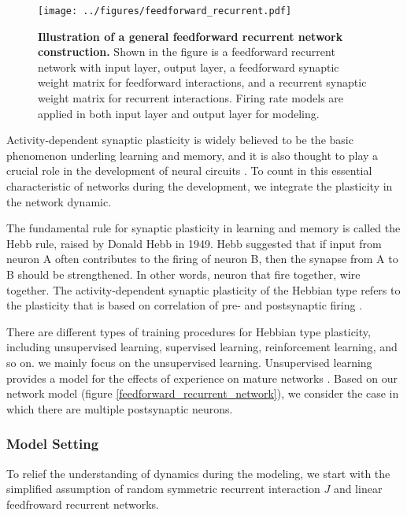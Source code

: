 \documentclass[11pt]{article}
\begin{document}
{		\begin{figure}[H]
			\centering
			\texttt{[image: ../figures/feedforward\_recurrent.pdf]}
			\caption{\textbf{Illustration of a general feedforward recurrent network construction.} Shown in the figure is a feedforward recurrent network with input layer, output layer, a feedforward synaptic weight matrix for feedforward interactions, and a recurrent synaptic weight matrix for recurrent interactions. Firing rate models are applied in both input layer and output layer for modeling.}
			\label{fig:feedforward_recurrent_network}
		\end{figure} 
	
	Activity-dependent synaptic plasticity is widely believed to be the basic phenomenon underling learning and memory, and it is also thought to play a crucial role in the development of neural circuits \cite{dayan2005theoretical}. To count in this essential characteristic of networks during the development, we integrate the plasticity in the network dynamic. 
	
	The fundamental rule for synaptic plasticity in learning and memory is called the Hebb rule, raised by Donald Hebb in 1949. Hebb suggested that if input from neuron A often contributes to the firing of neuron B, then the synapse from A to B should be strengthened. In other words, neuron that fire together, wire together. The activity-dependent synaptic plasticity of the Hebbian type refers to the plasticity that is based on correlation of pre- and postsynaptic firing \cite{dayan2005theoretical}. 
	
	There are different types of training procedures for Hebbian type plasticity, including unsupervised learning, supervised learning, reinforcement learning, and so on. we mainly focus on the unsupervised learning. Unsupervised learning provides a model for the effects of experience on mature networks \cite{dayan2005theoretical}. Based on our network model (figure \ref{feedforward_recurrent_network}), we consider the case in which there are multiple postsynaptic neurons. 
	
	\subsubsection{Model Setting}
	To relief the understanding of dynamics during the modeling, we start with the simplified assumption of random symmetric recurrent interaction $J$ and linear feedfroward recurrent networks.
	
}
\end{document}
